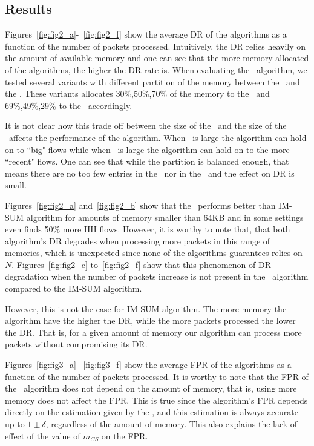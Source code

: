 \subsection{Results}



Figures~\ref{fig:fig2_a}-~\ref{fig:fig2_f} show the average DR of the algorithms as a function of the number of packets processed. Intuitively, the DR relies heavily on the amount of available memory and one can see that the more memory allocated of the algorithms, the higher the DR rate is. When evaluating the \cs\ algorithm, we tested several variants with different partition of the memory between the \cs\ and the \sfa. These variants allocates 30\%,50\%,70\% of the memory to the \cs\ and 69\%,49\%,29\% to the \sfa\ accordingly.

It is not clear how this trade off between the size of the \cs\ and the size of the \sfa\ affects the performance of the algorithm. When \cs\ is large the algorithm can hold on to ``big" flows while when  \sfa\ is large the algorithm can hold on to the more ``recent" flows. One can see that while the partition is balanced enough, that means there are no too few entries in the \sfa\ nor in the \cs\ and the effect on DR is small.

Figures~\ref{fig:fig2_a} and~\ref{fig:fig2_b} show that the \cs\ performs better than IM-SUM algorithm for amounts of memory smaller than 64KB and in some settings even finds 50\% more HH flows. However, it is worthy to note that, that both algorithm's DR degrades when processing more packets in this range of memories, which is unexpected since none of the algorithms guarantees relies on $N$.
Figures~\ref{fig:fig2_c} to~\ref{fig:fig2_f} show that this phenomenon of DR degradation when the number of packets increase is not present in the \cs\ algorithm compared to the IM-SUM algorithm.

However, this is not the case for IM-SUM algorithm. The more memory the algorithm have the higher the DR, while the more packets processed the lower the DR. That is, for a given amount of memory our algorithm can process more packets without compromising its DR.



Figures~\ref{fig:fig3_a}-~\ref{fig:fig3_f} show the average FPR of the algorithms as a function of the number of packets processed. It is worthy to note that the FPR of the \cs\ algorithm does not depend on the amount of memory, that is, using more memory does not affect the FPR. This is true since the algorithm's FPR depends directly on the estimation given by the \sea, and this estimation is always accurate up to $1\pm \delta$, regardless of the amount of memory. This also explains the lack of effect of the value of $m_{CS}$ on the FPR.

